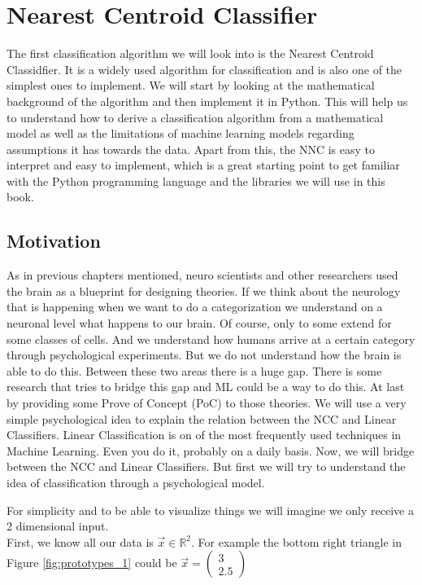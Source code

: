 \chapter{Nearest Centroid Classifier}
The first classification algorithm we will look into is the Nearest Centroid Classidfier.
It is a widely used algorithm for classification and is also one of the simplest ones to implement.
We will start by looking at the mathematical background of the algorithm and then implement it in Python.
This will help us to understand how to derive a classification algorithm from a mathematical model as well as the
limitations of machine learning models regarding assumptions it has towards the data.
Apart from this, the NNC is easy to interpret and easy to implement, which is a great starting point to get familiar with 
the Python programming language and the libraries we will use in this book.

\section{Motivation}
As in previous chapters mentioned, neuro scientists and other researchers used the brain as a blueprint for
designing theories. If we think about the neurology that is happening when
we want to do a categorization we understand on a neuronal level what happens to our brain.
Of course, only to some extend for some classes of cells. And we understand how humans
arrive at a certain category through psychological experiments. But we do not understand
how the brain is able to do this.
Between these two areas there is a huge gap. There is some research that tries to bridge this gap and ML could be a way to do this.
At last by providing some Prove of Concept (PoC) to those theories.
We will use a very simple psychological idea to explain the relation between the NCC and Linear Classifiers.
Linear Classification is on of the most frequently used techniques in Machine Learning. Even you do it, probably on a daily basis.
Now, we will bridge between the NCC and Linear Classifiers. But first we will try to understand the idea of classification through a psychological model.


\newline
For simplicity and to be able to visualize things we will imagine we only receive a 2 dimensional input.\\
First, we know all our data is $\vec{x} \in \mathbb{R}^2$. For example the bottom right triangle in Figure \ref{fig:prototypes_1} could be 
$\vec{x} = \begin{pmatrix}3\\2.5\end{pmatrix}$

